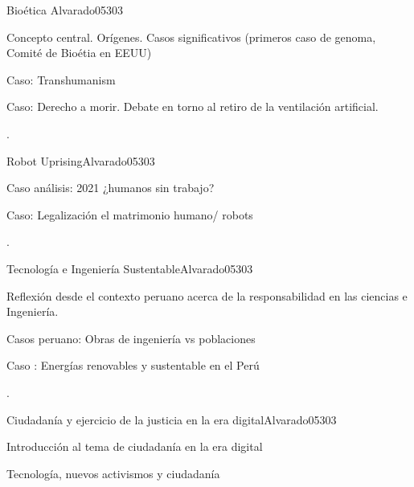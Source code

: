 \begin{syllabus}
\begin{unit}{}{Bioética }{Alvarado05}{30}{3}
   \begin{topics}
      \item  Concepto central. Orígenes. Casos significativos (primeros caso de genoma, Comité de Bioétia en EEUU)
      \item  Caso: Transhumanism
      \item  Caso: Derecho a morir. Debate en torno al retiro de la ventilación artificial.
   \end{topics}

   \begin{learningoutcomes}
      \item . 
   \end{learningoutcomes}
\end{unit}

\begin{unit}{}{Robot Uprising}{Alvarado05}{30}{3}
   \begin{topics}
      \item  Caso análisis: 2021 ¿humanos sin trabajo? 
      \item  Caso: Legalización el matrimonio humano/ robots 
   \end{topics}

   \begin{learningoutcomes}
      \item .
   \end{learningoutcomes}
\end{unit}

\begin{unit}{}{ Tecnología e Ingeniería Sustentable}{Alvarado05}{30}{3}
   \begin{topics}
      \item Reflexión desde el contexto peruano acerca de la responsabilidad en las ciencias e Ingeniería. 
      \item Casos peruano: Obras de ingeniería vs poblaciones
      \item Caso : Energías renovables y sustentable en el Perú 
   \end{topics}

   \begin{learningoutcomes}
      \item . 
   \end{learningoutcomes}
\end{unit}

\begin{unit}{}{ Ciudadanía y ejercicio de la justicia en la era digital}{Alvarado05}{30}{3}
   \begin{topics}
      \item Introducción al tema de ciudadanía en la era digital
      \item Tecnología,  nuevos activismos y ciudadanía
   \end{topics}


\end{unit}
\end{syllabus}
